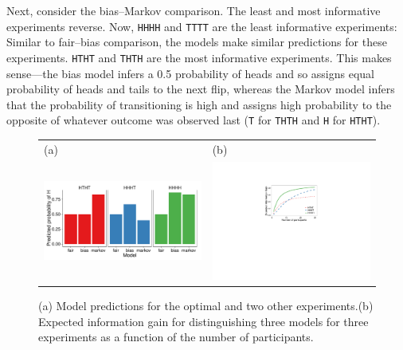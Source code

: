 \documentclass{article}
\begin{document}
Next, consider the bias--Markov comparison.
The least and most informative experiments reverse.
Now, \lstinline{HHHH} and \lstinline{TTTT} are the least informative experiments: Similar to fair--bias comparison, the models make similar predictions for these experiments.
\lstinline{HTHT} and \lstinline{THTH} are the most informative experiments.
This makes sense---the bias model infers a 0.5 probability of heads and so assigns equal probability of heads and tails to the next flip, whereas the Markov model infers that the probability of transitioning is high and assigns high probability to the opposite of whatever outcome was observed last (\lstinline{T} for \lstinline{THTH} and \lstinline{H} for \lstinline{HTHT}).



\begin{figure}[t]
\centering
\begin{tabular}{l l}
(a) & (b)\\
\includegraphics[width=0.6\columnwidth]{img/coin_predictions.pdf} &
\includegraphics[width=0.4\columnwidth]{img/coin_eig_3way_nsubj_wlegend.pdf} \\\end{tabular}
\caption{(a) Model predictions for the optimal and two other experiments.(b) Expected information gain for distinguishing three models for three experiments as a function of the number of participants.}
\label{fig:coin_preds}
\end{figure}
\end{document}
